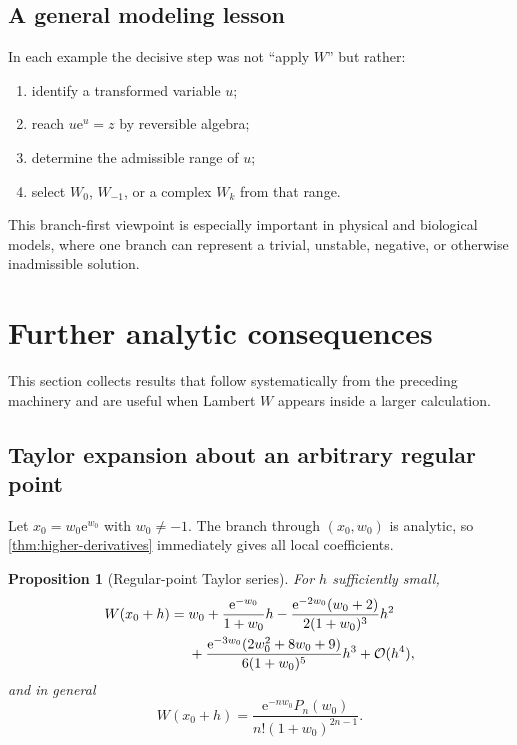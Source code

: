 \documentclass[11pt]{article}
\numberwithin{equation}{section}
\newtheorem{proposition}[theorem]{Proposition}
\theoremstyle{definition}
\theoremstyle{remark}
\newcommand{\e}{\mathrm e}
\begin{document}
\subsection{A general modeling lesson}

In each example the decisive step was not ``apply $W$'' but rather:
\begin{enumerate}
\item identify a transformed variable $u$;
\item reach $u\e^u=z$ by reversible algebra;
\item determine the admissible range of $u$;
\item select $W_0$, $W_{-1}$, or a complex $W_k$ from that range.
\end{enumerate}
This branch-first viewpoint is especially important in physical and biological
models, where one branch can represent a trivial, unstable, negative, or
otherwise inadmissible solution.

\section{Further analytic consequences}
\label{sec:further}

This section collects results that follow systematically from the preceding
machinery and are useful when Lambert $W$ appears inside a larger calculation.

\subsection{Taylor expansion about an arbitrary regular point}

Let $x_0=w_0\e^{w_0}$ with $w_0\ne-1$.  The branch through $(x_0,w_0)$ is
analytic, so \cref{thm:higher-derivatives} immediately gives all local
coefficients.

\begin{proposition}[Regular-point Taylor series]
\label{prop:regular-taylor}
For $h$ sufficiently small,
\begin{align}
 W(x_0+h)={}&w_0
 +\frac{\e^{-w_0}}{1+w_0}h
 -\frac{\e^{-2w_0}(w_0+2)}{2(1+w_0)^3}h^2\notag\\
 &+\frac{\e^{-3w_0}(2w_0^2+8w_0+9)}{6(1+w_0)^5}h^3
 +\mathcal O(h^4),                                    \label{eq:regular-taylor}
\end{align}
and in general
\begin{equation}
 [h^n]W(x_0+h)
 =\frac{\e^{-nw_0}P_n(w_0)}{n!(1+w_0)^{2n-1}}.        \label{eq:regular-taylor-general}
\end{equation}
\end{proposition}
\end{document}

